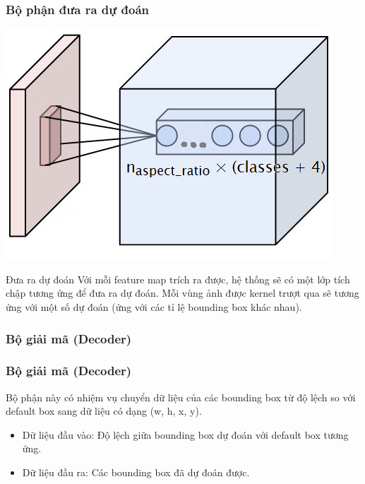 \documentclass{beamer}
\begin{document}
	\begin{frame}
		\frametitle{Bộ phận đưa ra dự đoán}
		
		\begin{center}
			\centering
			\includegraphics[width=0.5\linewidth]{depthcol.png}
			\vspace{0.3cm}
		\end{center}
		
		\begin{block}{Đưa ra dự đoán}
			Với mỗi feature map trích ra được, hệ thống sẽ có một lớp tích chập tương ứng để đưa ra dự đoán. Mỗi vùng ảnh được kernel trượt qua sẽ tương ứng với một số dự đoán (ứng với các tỉ lệ bounding box khác nhau).
		\end{block}
		
		
	\end{frame}
	
	
	
	
	

	
	\subsubsection{Bộ giải mã (Decoder)}
	
	\begin{frame}
		\frametitle{Bộ giải mã (Decoder)}
		Bộ phận này có nhiệm vụ chuyển dữ liệu của các bounding box từ độ lệch so với default box sang dữ liệu có dạng (w, h, x, y).
		
		\begin{itemize}
			\item Dữ liệu đầu vào: Độ lệch giữa bounding box dự đoán với default box tương ứng.
			
			\item Dữ liệu đầu ra: Các bounding box đã dự đoán được.
			
		\end{itemize}
	\end{frame}
	
\end{document}
